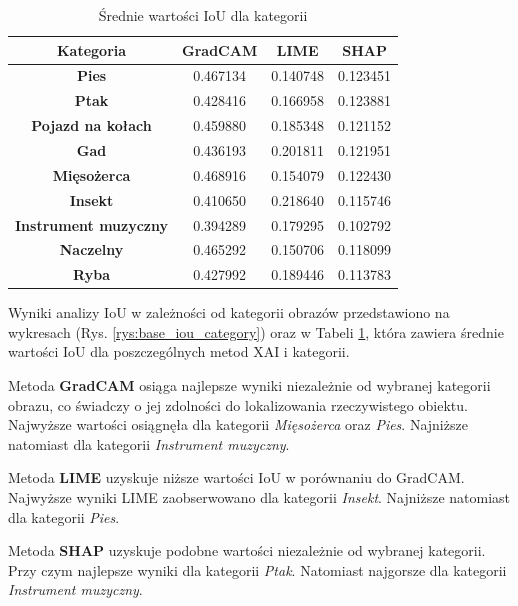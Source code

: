 \begin{table}[h]
	\centering
	\begin{tabular}{|c|c|c|c|}
		\hline
		\textbf{Kategoria}           & \textbf{GradCAM} & \textbf{LIME} & \textbf{SHAP} \\
		\hline
		\textbf{Pies}                & 0.467134         & 0.140748      & 0.123451      \\
		\hline
		\textbf{Ptak}                & 0.428416         & 0.166958      & 0.123881      \\
		\hline
		\textbf{Pojazd na kołach}    & 0.459880         & 0.185348      & 0.121152      \\
		\hline
		\textbf{Gad}                 & 0.436193         & 0.201811      & 0.121951      \\
		\hline
		\textbf{Mięsożerca}          & 0.468916         & 0.154079      & 0.122430      \\
		\hline
		\textbf{Insekt}              & 0.410650         & 0.218640      & 0.115746      \\
		\hline
		\textbf{Instrument muzyczny} & 0.394289         & 0.179295      & 0.102792      \\
		\hline
		\textbf{Naczelny}            & 0.465292         & 0.150706      & 0.118099      \\
		\hline
		\textbf{Ryba}                & 0.427992         & 0.189446      & 0.113783      \\
		\hline
	\end{tabular}
	\caption{Średnie wartości IoU dla kategorii}
	\label{tab:base_iou_category}
\end{table}

Wyniki analizy IoU w zależności od kategorii obrazów przedstawiono na wykresach (Rys. \ref{rys:base_iou_category}) oraz w Tabeli \ref{tab:base_iou_category}, która zawiera średnie wartości IoU dla poszczególnych metod XAI i kategorii.

Metoda \textbf{GradCAM} osiąga najlepsze wyniki niezależnie od wybranej kategorii obrazu, co świadczy o jej zdolności do lokalizowania rzeczywistego obiektu.
Najwyższe wartości osiągnęła dla kategorii \textit{Mięsożerca} oraz \textit{Pies}.
Najniższe natomiast dla kategorii \textit{Instrument muzyczny}.

Metoda \textbf{LIME} uzyskuje niższe wartości IoU w porównaniu do GradCAM.
Najwyższe wyniki LIME zaobserwowano dla kategorii \textit{Insekt}.
Najniższe natomiast dla kategorii \textit{Pies}.

Metoda \textbf{SHAP} uzyskuje podobne wartości niezależnie od wybranej kategorii.
Przy czym najlepsze wyniki dla kategorii \textit{Ptak}.
Natomiast najgorsze dla kategorii \textit{Instrument muzyczny}.

